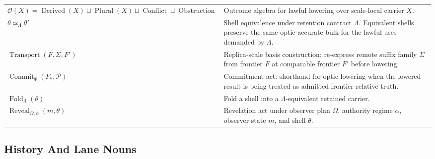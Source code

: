 \documentclass{aion}
\begin{document}
\begin{center}
\begin{tabularx}{\textwidth}{@{}>{\raggedright\arraybackslash}p{}X@{}}
		\(\mathcal{O}(X) = \operatorname{Derived}(X) \sqcup \operatorname{Plural}(X) \sqcup \operatorname{Conflict} \sqcup \operatorname{Obstruction}\) & Outcome algebra for lawful lowering over scale-local carrier \(X\).                                                                                          \\
		\(\theta \simeq_{\Lambda} \theta'\)                                                                                                             & Shell equivalence under retention contract \(\Lambda\). Equivalent shells preserve the same optic-accurate bulk for the lawful uses demanded by \(\Lambda\). \\
		\(\operatorname{Transport}(F,\Sigma,F')\)                                                                                                       & Replica-scale basis construction: re-express remote suffix family \(\Sigma\) from frontier \(F\) at comparable frontier \(F'\) before lowering.              \\
		\(\operatorname{Commit}_{\Psi}(F_*, \mathcal{P})\)                                                                                              & Commitment act: shorthand for optic lowering when the lowered result is being treated as admitted frontier-relative truth.                                   \\
		\(\operatorname{Fold}_{\Lambda}(\theta)\)                                                                                                       & Fold a shell into a \(\Lambda\)-equivalent retained carrier.                                                                                                 \\
		\(\operatorname{Reveal}_{\Omega,\alpha}(m,\theta)\)                                                                                             & Revelation act under observer plan \(\Omega\), authority regime \(\alpha\), observer state \(m\), and shell \(\theta\).                                      \\
		\bottomrule
	\end{tabularx}
	\AIONTableStyleOff
\end{center}

\subsection{History And Lane Nouns}
\end{document}
